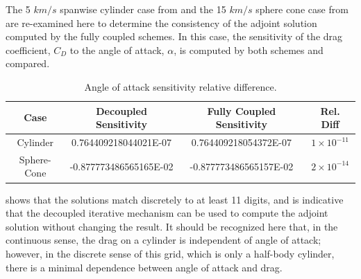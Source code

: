 The 5 $km/s$ spanwise cylinder case from  and the 15
$km/s$ sphere cone case from  are re-examined here
to determine the consistency of the adjoint solution computed by the fully
coupled schemes.  In this case, the sensitivity of the drag coefficient, $C_D$
to the angle of attack, $\alpha$, is computed by both schemes and compared.
\begin{table}[h]
  \centering
  \begin{tabular}{c|c|c|c}
    Case & Decoupled Sensitivity & Fully Coupled Sensitivity & Rel. Diff\\
    \hline
    Cylinder    &  0.764409218044021E-07 &  0.764409218054372E-07 & $1 \times 10^{-11}$ \\
    Sphere-Cone & -0.877773486565165E-02 & -0.877773486565157E-02 & $2 \times 10^{-14}$
  \end{tabular}
  \caption{Angle of attack sensitivity relative difference.}
  \label{tab:cylinder-adj-diff}
\end{table}
 shows that the solutions match discretely to at
least 11 digits, and is indicative that the decoupled iterative mechanism can be
used to compute the adjoint solution without changing the result.  It should be
recognized here that, in the continuous sense, the drag on a cylinder is
independent of angle of attack; however, in the discrete sense of this grid,
which is only a half-body cylinder, there is a minimal dependence between angle
of attack and drag.


